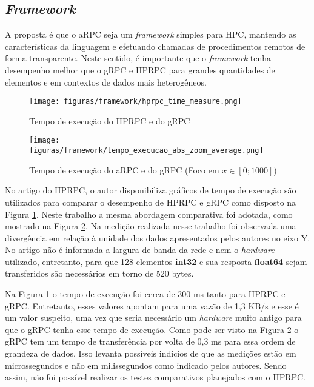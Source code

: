 \subsection{\textit{Framework}}

A proposta é que o aRPC seja um \textit{framework} simples para HPC, mantendo as características da linguagem e efetuando chamadas de procedimentos remotos de forma transparente. Neste sentido, é importante que o \textit{framework} tenha desempenho melhor que o gRPC e HPRPC para grandes quantidades de elementos e em contextos de dados mais heterogêneos.

\begin{figure}[ht]
    \centering
    \caption{Tempo de execução do HPRPC e do gRPC}
    \texttt{[image: figuras/framework/hprpc\_time\_measure.png]}
    \label{fig:hprpc_time_measure}
\end{figure}

\begin{figure}[ht]
    \centering
    \caption{Tempo de execução do aRPC e do gRPC (Foco em $x \in [0;1000]$)}
    \texttt{[image: figuras/framework/tempo\_execucao\_abs\_zoom\_average.png]}
    \label{fig:tempo_execucao_abs_zoom_average}
\end{figure}

No artigo do HPRPC, o autor disponibiliza gráficos de tempo de execução são utilizados para comparar o desempenho de HPRPC e gRPC \cite{bagci_lightweight_2016} como disposto na Figura \ref{fig:hprpc_time_measure}. Neste trabalho a mesma abordagem comparativa foi adotada, como mostrado na Figura \ref{fig:tempo_execucao_abs_zoom_average}. Na medição realizada nesse trabalho foi observada uma divergência em relação à unidade dos dados apresentados pelos autores no eixo Y. No artigo não é informada a largura de banda da rede e nem o \textit{hardware} utilizado, entretanto, para que 128 elementos \textbf{int32} e sua resposta \textbf{float64} sejam transferidos são necessários em torno de 520 bytes. 

Na Figura \ref{fig:hprpc_time_measure} o tempo de execução foi cerca de 300 ms tanto para HPRPC e gRPC. Entretanto, esses valores apontam para uma vazão de 1,3 KB/s e esse é um valor suspeito, uma vez que seria necessário um \emph{hardware} muito antigo para que o gRPC tenha esse tempo de execução. Como pode ser visto na Figura \ref{fig:tempo_execucao_abs_zoom_average} o gRPC tem um tempo de transferência por volta de 0,3 ms para essa ordem de grandeza de dados. Isso levanta possíveis indícios de que as medições estão em microssegundos e não em milissegundos como indicado pelos autores. Sendo assim, não foi possível realizar os testes comparativos planejados com o HPRPC.

